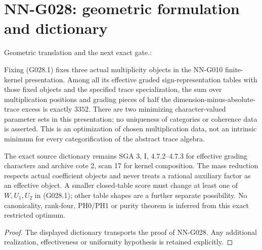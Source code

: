 \section{NN-G028: geometric formulation and dictionary}
\begin{geometricstatement}[NN-G028]
Geometric translation and the next exact gate.:

Fixing (G028.1) fixes three actual multiplicity objects
in the NN-G010 finite-kernel presentation. Among all
its effective graded sign-representation tables with
those fixed objects and the specified trace specialization,
the sum over multiplication positions and grading pieces
of half the dimension-minus-absolute-trace excess is
exactly $3352$. There are two minimizing character-valued
parameter sets in this presentation; no uniqueness of
categories or coherence data is asserted. This is an
optimization of chosen multiplication data, not an
intrinsic minimum for every categorification of the
abstract trace algebra.

The exact source dictionary remains SGA 3, I,
4.7.2--4.7.3 for effective grading characters and
archive cote 2, scan 17 for kernel composition.
The mass reduction respects actual coefficient
objects and never treats a rational auxiliary factor
as an effective object. A smaller closed-table score
must change at least one of $W,U_1,U_2$ in (G028.1);
other table shapes are a further separate possibility.
No canonicality, rank-four, PH0/PH1 or purity theorem
is inferred from this exact restricted optimum.


\end{geometricstatement}
\begin{proof} The displayed dictionary transports the proof of NN-G028. Any additional realization, effectiveness or uniformity hypothesis is retained explicitly.\end{proof}


